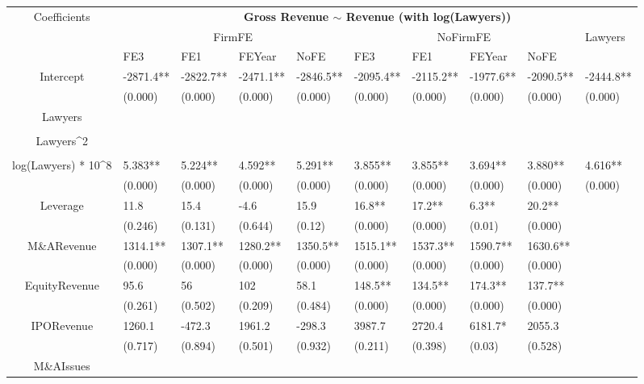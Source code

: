 \documentclass{article}
\begin{document}
\begin{table}[H]
\centering
\begin{tabular}{|clllllllll|}
\hline
\multirow{3}{*}{Coefficients} & \multicolumn{9}{c|}{\textbf{Gross Revenue $\sim$ Revenue (with log(Lawyers))}} \\
\cline{2-10}
& \multicolumn{4}{c}{FirmFE} & \multicolumn{4}{c}{NoFirmFE} & \multirow{2}{*}{Lawyers} \\
\cline{2-9}
& FE3 & FE1 & FEYear & NoFE & FE3 & FE1 & FEYear & NoFE &  \\
\hline
 
Intercept & -2871.4** & -2822.7** & -2471.1** & -2846.5** & -2095.4** & -2115.2** & -1977.6** & -2090.5** & -2444.8** \\ 
   & (0.000) & (0.000) & (0.000) & (0.000) & (0.000) & (0.000) & (0.000) & (0.000) & (0.000) \\ 
  Lawyers &  &  &  &  &  &  &  &  &  \\ 
   &  &  &  &  &  &  &  &  &  \\ 
  Lawyers^2 &  &  &  &  &  &  &  &  &  \\ 
   &  &  &  &  &  &  &  &  &  \\ 
  log(Lawyers) * 10^8 & 5.383** & 5.224** & 4.592** & 5.291** & 3.855** & 3.855** & 3.694** & 3.880** & 4.616** \\ 
   & (0.000) & (0.000) & (0.000) & (0.000) & (0.000) & (0.000) & (0.000) & (0.000) & (0.000) \\ 
  Leverage & 11.8 & 15.4 & -4.6 & 15.9 & 16.8** & 17.2** & 6.3** & 20.2** &  \\ 
   & (0.246) & (0.131) & (0.644) & (0.12) & (0.000) & (0.000) & (0.01) & (0.000) &  \\ 
  M\&ARevenue & 1314.1** & 1307.1** & 1280.2** & 1350.5** & 1515.1** & 1537.3** & 1590.7** & 1630.6** &  \\ 
   & (0.000) & (0.000) & (0.000) & (0.000) & (0.000) & (0.000) & (0.000) & (0.000) &  \\ 
  EquityRevenue & 95.6 & 56 & 102 & 58.1 & 148.5** & 134.5** & 174.3** & 137.7** &  \\ 
   & (0.261) & (0.502) & (0.209) & (0.484) & (0.000) & (0.000) & (0.000) & (0.000) &  \\ 
  IPORevenue & 1260.1 & -472.3 & 1961.2 & -298.3 & 3987.7 & 2720.4 & 6181.7* & 2055.3 &  \\ 
   & (0.717) & (0.894) & (0.501) & (0.932) & (0.211) & (0.398) & (0.03) & (0.528) &  \\ 
  M\&AIssues &  &  &  &  &  &  &  &  &  \\ 

\end{tabular}
\end{table}
\end{document}
